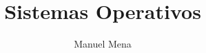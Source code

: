 \documentclass[a4paper]{article}
\theoremstyle{remark}
\theoremstyle{definition}
\theoremstyle{plain}
\begin{document}
\title{Sistemas Operativos}
\author{Manuel Mena}
\maketitle

\tableofcontents

\newpage

\end{document}
